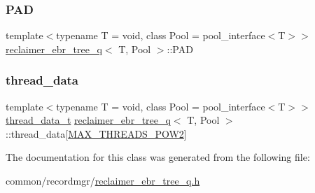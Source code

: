 \subsubsection{\texorpdfstring{P\+AD}{PAD}}
{\footnotesize\ttfamily template$<$typename T  = void, class Pool  = pool\+\_\+interface$<$\+T$>$$>$ \\
\hyperlink{classreclaimer__ebr__tree__q}{reclaimer\+\_\+ebr\+\_\+tree\+\_\+q}$<$ T, Pool $>$\+::P\+AD\hspace{0.3cm}{\ttfamily [protected]}}

\mbox{\label{classreclaimer__ebr__tree__q_a1522f869ac47606c7085daa105fcd4e8}} 
\subsubsection{\texorpdfstring{thread\+\_\+data}{thread\_data}}
{\footnotesize\ttfamily template$<$typename T  = void, class Pool  = pool\+\_\+interface$<$\+T$>$$>$ \\
\hyperlink{structthread__data__t}{thread\+\_\+data\+\_\+t} \hyperlink{classreclaimer__ebr__tree__q}{reclaimer\+\_\+ebr\+\_\+tree\+\_\+q}$<$ T, Pool $>$\+::thread\+\_\+data\mbox{[}\hyperlink{plaf_8h_ac1585a3455dd3e33e877e588be9e466b}{M\+A\+X\+\_\+\+T\+H\+R\+E\+A\+D\+S\+\_\+\+P\+O\+W2}\mbox{]}\hspace{0.3cm}{\ttfamily [protected]}}



The documentation for this class was generated from the following file\+:\begin{DoxyCompactItemize}
\item 
common/recordmgr/\hyperlink{reclaimer__ebr__tree__q_8h}{reclaimer\+\_\+ebr\+\_\+tree\+\_\+q.\+h}\end{DoxyCompactItemize}
